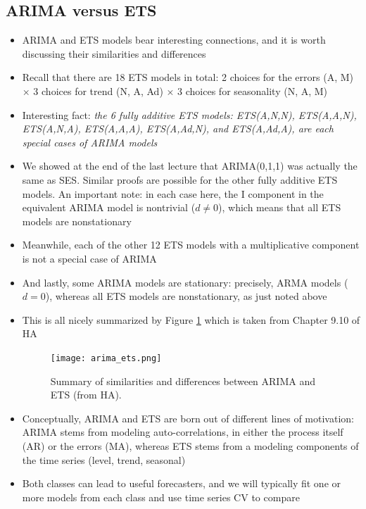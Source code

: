 \documentclass{article}
\begin{document}
\subsection{ARIMA versus ETS}

\begin{itemize}
\item ARIMA and ETS models bear interesting connections, and it is worth
  discussing their similarities and differences

\item Recall that there are 18 ETS models in total: 2 choices for the errors (A,
  M) $\times$ 3 choices for trend (N, A, Ad) $\times$ 3 choices for seasonality
  (N, A, M)

\item Interesting fact: \emph{the 6 fully additive ETS models: ETS(A,N,N), 
    ETS(A,A,N), ETS(A,N,A), ETS(A,A,A), ETS(A,Ad,N), and ETS(A,Ad,A), are each  
    special cases of ARIMA models}

\item We showed at the end of the last lecture that ARIMA(0,1,1) was actually
  the same as SES. Similar proofs are possible for the other fully additive ETS
  models. An important note: in each case here, the I component in the
  equivalent ARIMA model is nontrivial ($d \not= 0$), which means that all ETS 
  models are nonstationary  

\item Meanwhile, each of the other 12 ETS models with a multiplicative component  
  is not a special case of ARIMA 

\item And lastly, some ARIMA models are stationary: precisely, ARMA models ($d =
  0$), whereas all ETS models are nonstationary, as just noted above

\item This is all nicely summarized by Figure \ref{fig:arima_ets} which is taken
  from Chapter 9.10 of HA

\begin{figure}[htb]
\centering
\texttt{[image: arima\_ets.png]}
\caption{Summary of similarities and differences between ARIMA and ETS (from
  HA).} 
\label{fig:arima_ets}
\end{figure}

\item Conceptually, ARIMA and ETS are born out of different lines of motivation:
  ARIMA stems from modeling auto-correlations, in either the process itself (AR) 
  or the errors (MA), whereas ETS stems from a modeling components of the time
  series (level, trend, seasonal)

\item Both classes can lead to useful forecasters, and we will typically fit one
  or more models from each class and use time series CV to compare    
\end{itemize}
\end{document}
